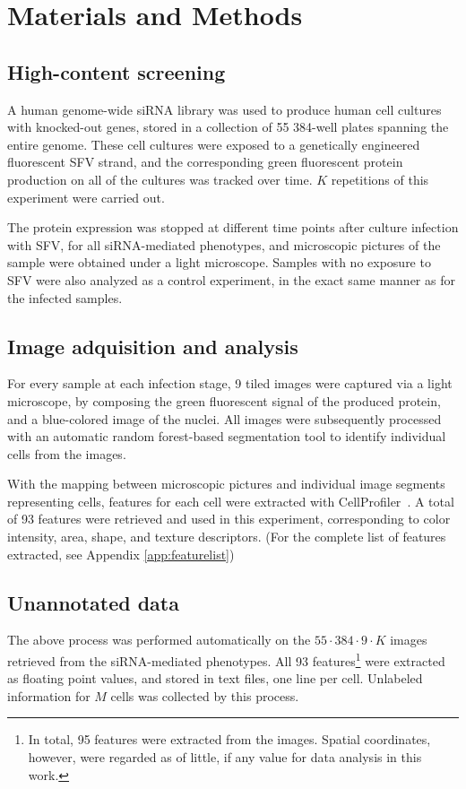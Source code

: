 \documentclass[oneside, a4paper, draft]{memoir} %
\begin{document}
\section{Materials and Methods}
\subsection{High-content screening}
A human genome-wide siRNA library was used to produce human cell cultures with knocked-out
genes, stored in a collection of 55 384-well plates spanning the entire genome. 
These cell cultures were exposed to a genetically engineered fluorescent SFV strand, and the corresponding
green fluorescent protein production on all of the cultures was tracked over time.  $K$ repetitions
of this experiment were carried out.

The protein expression was stopped at different time points after culture infection with SFV, for all siRNA-mediated
phenotypes, and microscopic pictures of the sample were obtained under a light microscope. Samples with no exposure
to SFV were also analyzed as a control experiment, in the exact same manner as for the infected samples.

\subsection{Image adquisition and analysis}
For every sample at each infection stage, 9 tiled images were captured via a light microscope, by composing the
green fluorescent signal of the produced protein, and a blue-colored image of the nuclei. All images were
subsequently processed with an automatic  random
forest-based segmentation tool to identify individual cells from the images.

With the mapping between microscopic pictures and individual image segments representing cells, features for each cell
were extracted with CellProfiler~\cite{carpenter2006cellprofiler}.
A total of 93 features were retrieved and used in this experiment, corresponding to color intensity, area, shape, and
texture descriptors. (For the complete list of features extracted, see Appendix \ref{app:featurelist})

\subsection{Unannotated data}
The above process was performed automatically on the  $55 \cdot 384 \cdot 9 \cdot K$
images retrieved from the siRNA-mediated phenotypes. All 93 features\footnote{In total, 95 features were extracted
from the images. Spatial coordinates, however, were regarded as of little, if any value for data analysis in this
work.} were extracted as floating point values, and stored in text files, one line per cell. Unlabeled information for
 $M$ cells was collected by this process.
\end{document}
